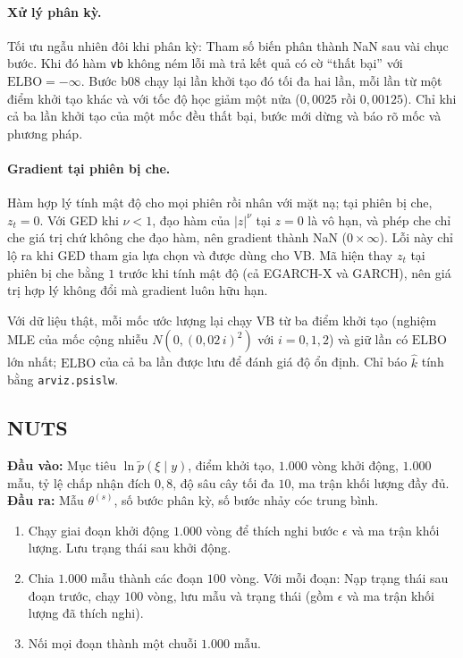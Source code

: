 \documentclass[12pt,a4paper]{article}
\newcounter{thuattoan}
\newenvironment{thuattoan}[1]{%
  \refstepcounter{thuattoan}%
  \begin{tcolorbox}[enhanced,breakable,colback=nenkhung,colframe=vienkhung,boxrule=0.5pt,arc=1mm,
    left=6pt,right=6pt,top=4pt,bottom=4pt,
    title={\textbf{Thuật toán \thethuattoan.} #1},coltitle=black,colbacktitle=nenkhung!60!vienkhung!25]%
  \small
}{\end{tcolorbox}}
\theoremstyle{remark}
\newcommand{\ELBO}{\mathrm{ELBO}}
\newcommand{\Ncal}{N}
\newcommand{\ma}[1]{\texttt{\small #1}}
\begin{document}
\paragraph{Xử lý phân kỳ.} Tối ưu ngẫu nhiên đôi khi phân kỳ: Tham số biến phân thành NaN sau vài chục bước. Khi đó hàm \ma{vb} không ném lỗi mà trả kết quả có cờ ``thất bại'' với $\ELBO=-\infty$. Bước b08 chạy lại lần khởi tạo đó tối đa hai lần, mỗi lần từ một điểm khởi tạo khác và với tốc độ học giảm một nửa ($0{,}0025$ rồi $0{,}00125$). Chỉ khi cả ba lần khởi tạo của một mốc đều thất bại, bước mới dừng và báo rõ mốc và phương pháp.

\paragraph{Gradient tại phiên bị che.} Hàm hợp lý tính mật độ cho mọi phiên rồi nhân với mặt nạ; tại phiên bị che, $z_t=0$. Với GED khi $\nu<1$, đạo hàm của $|z|^{\nu}$ tại $z=0$ là vô hạn, và phép che chỉ che giá trị chứ không che đạo hàm, nên gradient thành NaN ($0\times\infty$). Lỗi này chỉ lộ ra khi GED tham gia lựa chọn và được dùng cho VB. Mã hiện thay $z_t$ tại phiên bị che bằng $1$ trước khi tính mật độ (cả EGARCH-X và GARCH), nên giá trị hợp lý không đổi mà gradient luôn hữu hạn.

Với dữ liệu thật, mỗi mốc ước lượng lại chạy VB từ ba điểm khởi tạo (nghiệm MLE của mốc cộng nhiễu $\Ncal(0,(0{,}02\,i)^2)$ với $i=0,1,2$) và giữ lần có $\ELBO$ lớn nhất; $\ELBO$ của cả ba lần được lưu để đánh giá độ ổn định. Chỉ báo $\hat k$ tính bằng \ma{arviz.psislw}.

\subsection{NUTS}

\begin{thuattoan}{Một chuỗi NUTS có điểm kiểm tra (hàm \ma{nuts\_chuoi})}
\textbf{Đầu vào:} Mục tiêu $\ln\tilde p(\xi\mid y)$, điểm khởi tạo, $1.000$ vòng khởi động, $1.000$ mẫu, tỷ lệ chấp nhận đích $0{,}8$, độ sâu cây tối đa $10$, ma trận khối lượng đầy đủ.\\
\textbf{Đầu ra:} Mẫu $\theta^{(s)}$, số bước phân kỳ, số bước nhảy cóc trung bình.
\begin{enumerate}
\item Chạy giai đoạn khởi động $1.000$ vòng để thích nghi bước $\epsilon$ và ma trận khối lượng. Lưu trạng thái sau khởi động.
\item Chia $1.000$ mẫu thành các đoạn $100$ vòng. Với mỗi đoạn: Nạp trạng thái sau đoạn trước, chạy $100$ vòng, lưu mẫu và trạng thái (gồm $\epsilon$ và ma trận khối lượng đã thích nghi).
\item Nối mọi đoạn thành một chuỗi $1.000$ mẫu.
\end{enumerate}
\end{thuattoan}
\end{document}

